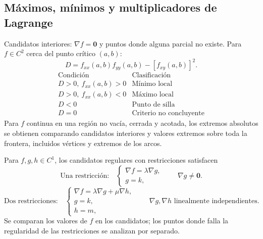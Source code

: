 \subsection*{Máximos, mínimos y multiplicadores de Lagrange}
Candidatos interiores: $\nabla f=\mathbf0$ y puntos donde alguna parcial no existe.
Para $f\in C^2$ cerca del punto crítico $(a,b)$:
\[
D=f_{xx}(a,b)f_{yy}(a,b)-[f_{xy}(a,b)]^2.
\]
\[
\begin{array}{c|c}
\text{Condición}&\text{Clasificación}\\\hline
D>0,\ f_{xx}(a,b)>0&\text{Mínimo local}\\
D>0,\ f_{xx}(a,b)<0&\text{Máximo local}\\
D<0&\text{Punto de silla}\\
D=0&\text{Criterio no concluyente}
\end{array}
\]
Para $f$ continua en una región no vacía, cerrada y acotada, los extremos
absolutos se obtienen comparando candidatos interiores y valores extremos
sobre toda la frontera, incluidos vértices y extremos de los arcos.

Para $f,g,h\in C^1$, los candidatos regulares con restricciones satisfacen
\[
\text{Una restricción:}\quad
\begin{cases}\nabla f=\lambda\nabla g,\\g=k,\end{cases}
\qquad \nabla g\ne\mathbf0.
\]
\[
\text{Dos restricciones:}\quad
\begin{cases}\nabla f=\lambda\nabla g+\mu\nabla h,\\g=k,\\h=m,\end{cases}
\qquad \nabla g,\nabla h\text{ linealmente independientes}.
\]
Se comparan los valores de $f$ en los candidatos; los puntos donde falla la
regularidad de las restricciones se analizan por separado.
\endgroup
